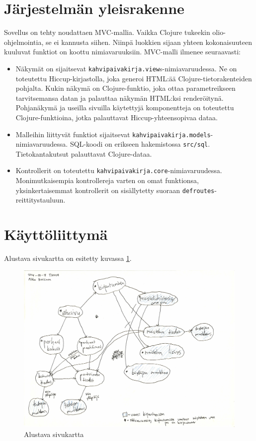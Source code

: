 \documentclass[a4paper,titlepage]{article}
\begin{document}
\section{Järjestelmän yleisrakenne}

Sovellus on tehty noudattaen MVC-mallia.
Vaikka Clojure tukeekin olio-ohjelmointia, se ei kannusta siihen.
Niinpä luokkien sijaan yhteen kokonaisuuteen kuuluvat funktiot on koottu nimiavaruuksiin.
MVC-malli ilmenee seuraavasti:

\begin{itemize}
    \item Näkymät on sijaitsevat
      \texttt{kahvipaivakirja.view}s-nimiavaruudessa. Ne on toteutettu
      Hiccup-kirjastolla, joka generoi HTML:ää
      Clojure-tietorakenteiden pohjalta. Kukin näkymä on
      Clojure-funktio, joka ottaa parametreikseen tarvitsemansa datan
      ja palauttaa näkymän HTML:ksi renderöitynä. Pohjanäkymä ja
      useilla sivuilla käytettyjä komponentteja on toteutettu
      Clojure-funktioina, jotka palauttavat Hiccup-yhteensopivaa
      dataa.

    \item Malleihin liittyvät funktiot sijaitsevat
      \texttt{kahvipaivakirja.models}-nimiavaruudessa. SQL-koodi on
      erikseen hakemistossa \texttt{src/sql}. Tietokantakutsut
      palauttavat Clojure-dataa.

    \item Kontrollerit on toteutettu
      \texttt{kahvipaivakirja.core}-nimiavaruudessa. Monimutkaisempia
      kontrollereja varten on omat funktionsa, yksinkertaisemmat
      kontrollerit on sisällytetty suoraan
      \texttt{defroutes}-reittitystauluun.
\end{itemize}


\section{Käyttöliittymä}

Alustava sivukartta on esitetty kuvassa \ref{fig:sivukartta}.

\begin{figure}[ht]
  \includegraphics[width=12cm]{ui/sitemap}
  \caption{Alustava sivukartta}
  \label{fig:sivukartta}
\end{figure}
\end{document}
